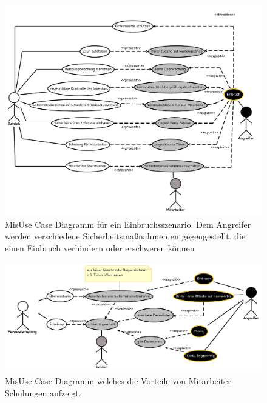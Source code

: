 \begin{figure}[h]
\includegraphics[scale=0.8,angle=90]{images/MisUseCaseEinbruch.pdf} 
\caption{MisUse Case Diagramm für ein Einbruchsszenario. Dem Angreifer werden verschiedene Sicherheitsmaßnahmen entgegengestellt, die einen Einbruch verhindern oder erschweren können}
\end{figure}


\begin{figure}[h]
\includegraphics[scale=0.8,angle=90]{images/Schulung.pdf} 
\caption{MisUse Case Diagramm welches die Vorteile von Mitarbeiter Schulungen aufzeigt.}
\end{figure}

